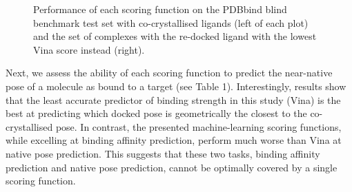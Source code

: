 \begin{figure}
\centering
{}
\caption{Performance of each scoring function on the PDBbind blind benchmark test set with co-crystallised ligands (left of each plot) and the set of complexes with the re-docked ligand with the lowest Vina score instead (right).}
\label{rfscore4:set-2-pdbbind-2012-trn-2}
\end{figure}

Next, we assess the ability of each scoring function to predict the near-native pose of a molecule as bound to a target (see Table 1). Interestingly, results show that the least accurate predictor of binding strength in this study (Vina) is the best at predicting which docked pose is geometrically the closest to the co-crystallised pose. In contrast, the presented machine-learning scoring functions, while excelling at binding affinity prediction, perform much worse than Vina at native pose prediction. This suggests that these two tasks, binding affinity prediction and native pose prediction, cannot be optimally covered by a single scoring function.

